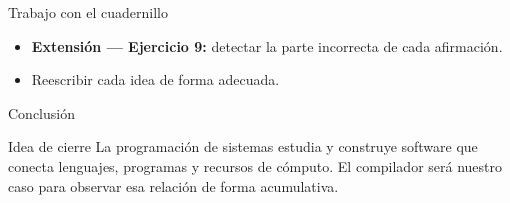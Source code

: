 \documentclass[11pt,spanish]{beamer}
\newcommand{\actividad}[1]{\textbf{\textcolor{Rojo}{#1}}}
\begin{document}
\begin{frame}{Trabajo con el cuadernillo}
\vfill

\begin{center}
\end{center}

\bigskip

\begin{itemize}
\item \textbf{Extensión --- Ejercicio 9:} detectar la parte incorrecta de cada afirmación.
\item Reescribir cada idea de forma adecuada.
\end{itemize}

\vfill
\end{frame}

\begin{frame}{Conclusión}
\vfill

\begin{center}
\end{center}

\bigskip

\begin{block}{Idea de cierre}
La programación de sistemas estudia y construye software que conecta lenguajes, programas y recursos de cómputo. El compilador será nuestro caso para observar esa relación de forma acumulativa.
\end{block}

\vfill
\end{frame}
\end{document}
